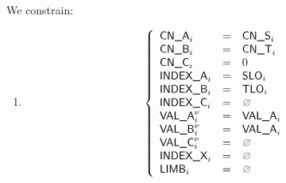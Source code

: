 \begin{center}
\end{center}

We constrain:
\begin{enumerate}
	\item 
\[
	\left\{
	\begin{array}{lclr}
		\cnA      _{i}       & = & \cnS_{i}     \\
		\cnB      _{i}       & = & \cnT_{i}     \\
		\cnC      _{i}       & = & 0            \\
		\indexA   _{i}       & = & \slo_{i}     \\
		\indexB   _{i}       & = & \tlo_{i}     \\
		\indexC   _{i}       & = & \nothing     \\
		\valA     _{i}\new{} & = & \valA_{i}    \\
		\valB     _{i}\new{} & = & \valA_{i}    \\
		\valC     _{i}\new{} & = & \nothing     \\
		\indexX   _{i}       & = & \nothing     \\
		\limb     _{i}       & = & \nothing     \\
	\end{array}
	\right.
\]
\end{enumerate}
